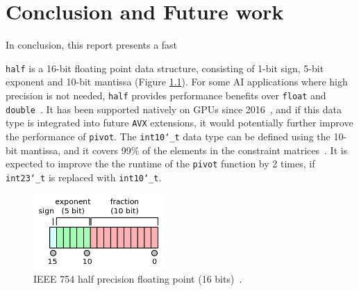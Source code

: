 \documentclass[logo,bsc,singlespacing,parskip]{infthesis}
\newcommand{\dthalfi}{\texttt{int10\char`_t}}
\newcommand{\dtshort}{\texttt{int16\char`_t}}
\newcommand{\dthalf}{\texttt{half}}
\newcommand{\dtfloat}{\texttt{float}}
\newcommand{\dtfloati}{\texttt{int23\char`_t}}
\newcommand{\dtdouble}{\texttt{double}}
\newcommand{\pivot}{\texttt{pivot}}
\begin{document}


\chapter{Conclusion and Future work}

In conclusion, this report presents a fast 




\dthalf{} is a 16-bit floating point data structure, consisting of 1-bit sign,
5-bit exponent and 10-bit mantissa (Figure \ref{fig:ieee-f16}). For some AI
applications where high precision is not needed, \dthalf{} provides performance
benefits over \dtfloat{} and \dtdouble{}~\cite{fp16-fast}. It has been supported
natively on GPUs since 2016~\cite{pascal-intro-fp16}, and if this data type is
integrated into future \texttt{AVX} extensions, it would potentially further
improve the performance of \pivot{}. The \dthalfi{} data type can be defined
using the 10-bit mantissa, and it covers 99\% of the elements in the constraint
matrices~\cite{FPL1}. It is expected to improve the the runtime of the \pivot{}
function by 2 times, if \dtfloati{} is replaced with \dthalfi{}.


\begin{figure}[H]
    \begin{center}
    \includegraphics[width=50mm,scale=0.1]{image/ieee-f16.png}
    \end{center}
    \caption{IEEE 754 half precision floating point (16 bits)~\cite{fp16-diagram}.}
    \label{fig:ieee-f16}
\end{figure}
\end{document}
